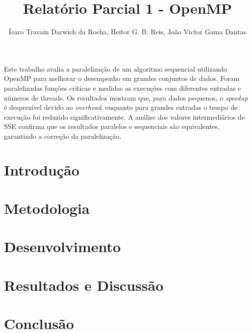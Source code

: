 \documentclass[12pt]{article}
\title{Relatório Parcial 1 - OpenMP}
\author{
    Ícaro Travain Darwich da Rocha\inst{1},
    Heitor G. B. Reis\inst{1},
    João Victor Gama Dantas\inst{1}
}
\begin{document}
 
\pagestyle{myheadings} %
\maketitle

\begin{resumo} 
Este trabalho avalia a paralelização de um algoritmo sequencial utilizando OpenMP para melhorar o desempenho em grandes conjuntos de dados. Foram paralelizadas funções críticas e medidas as execuções com diferentes entradas e números de threads. Os resultados mostram que, para dados pequenos, o \textit{speedup} é desprezível devido ao \textit{overhead}, enquanto para grandes entradas o tempo de execução foi reduzido significativamente. A análise dos valores intermediários de SSE confirma que os resultados paralelos e sequenciais são equivalentes, garantindo a correção da paralelização.
\end{resumo}

\section{Introdução}
\label{sec:ambiente}

\section{Metodologia}
\label{sec:graficos}

\section{Desenvolvimento}
\label{sec:validacao}

\section{Resultados e Discussão}
\label{sec:resultados}

\section{Conclusão}
\label{sec:conclusao}




\end{document}
